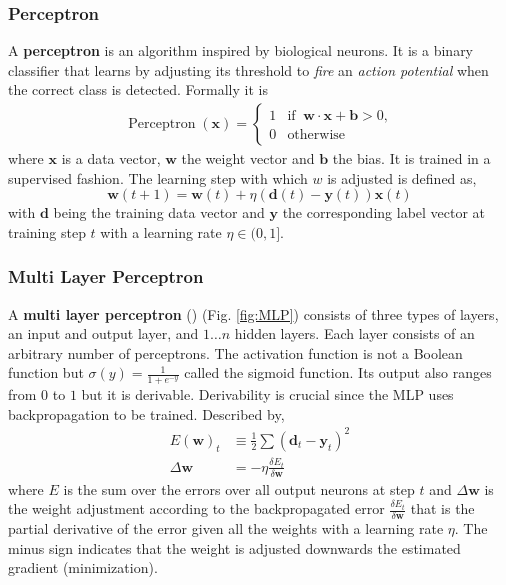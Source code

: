 \subsubsection{Perceptron}
A \textbf{perceptron} is an algorithm inspired by biological neurons. It is a binary classifier that learns by adjusting its threshold to \textsl{fire} an \textsl{action potential} when the correct class is detected. Formally it is
\begin{gather}
  \operatorname{Perceptron}(\mathbf{x}) = \begin{cases}1 & \text{if }\ \mathbf{w} \cdot \mathbf{x} + \mathbf{b} > 0,\\
  0 & \text{otherwise}\end{cases}
\end{gather}
where $\mathbf{x}$ is a data vector, $\mathbf{w}$ the weight vector and $\mathbf{b}$ the bias. It is trained in a supervised fashion. The learning step with which $w$ is adjusted is defined as,
\[\mathbf{w}(t+1) = \mathbf{w}(t) + \eta (\mathbf{d}(t) - \mathbf{y}(t))\mathbf{x}(t)\]
with $\mathbf{d}$ being the training data vector and $\mathbf{y}$ the corresponding label vector at training step $t$ with a learning rate $\eta \in (0,1]$.

\subsubsection{Multi Layer Perceptron}
A \textbf{multi layer perceptron} () (Fig. \ref{fig:MLP}) consists of three types of layers, an input and output layer, and $1 \dots n$ hidden layers. Each layer consists of an arbitrary number of perceptrons. The activation function is not a Boolean function but $\sigma(y) = \frac{1}{1+e^{-y}}$ called the sigmoid function. Its output also ranges from $0$ to $1$ but it is derivable. Derivability is crucial since the MLP uses backpropagation to be trained. Described by,
\begin{align}
  E(\mathbf{w})_t &\equiv \frac{1}{2} \sum (\mathbf{d}_t - \mathbf{y}_t)^2 \\
  \Delta \mathbf{w} &= - \eta \frac{\delta E_t}{\delta \mathbf{w}}
\end{align}
where $E$ is the sum over the errors over all output neurons at step $t$ and $\Delta \mathbf{w}$ is the weight adjustment according to the backpropagated error $\frac{\delta E_t}{\delta \mathbf{w}}$ that is the partial derivative of the error given all the weights with a learning rate $\eta$. The minus sign indicates that the weight is adjusted downwards the estimated gradient (minimization).


